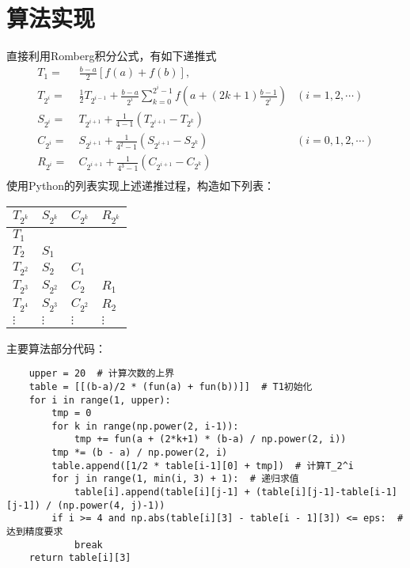 \documentclass[12pt, a4paper, oneside]{ctexart}
\begin{document}
\section{算法实现}
直接利用Romberg积分公式，有如下递推式\begin{equation*}
    \begin{aligned}
        T_1 =&\ \frac{b-a}{2}[f(a)+f(b)],\\
        T_{2^{i}} =&\ \frac{1}{2}T_{2^{i-1}}+\frac{b-a}{2^i}\sum_{k=0}^{2^i-1}f(a+(2k+1)\frac{b-1}{2^i})&(i=1,2,\cdots)\\
        S_{2^{i}} =&\ T_{2^{i+1}}+\frac{1}{4-1}(T_{2^{i+1}}-T_{2^k})\\
        C_{2^{i}} =&\ S_{2^{i+1}}+\frac{1}{4^2-1}(S_{2^{i+1}}-S_{2^k})&(i=0,1,2,\cdots)\\
        R_{2^{i}} =&\ C_{2^{i+1}}+\frac{1}{4^3-1}(C_{2^{i+1}}-C_{2^k})\\
    \end{aligned}
\end{equation*}
使用Python的列表实现上述递推过程，构造如下列表：
\renewcommand\arraystretch{0.8} %
\begin{table}[!htbp] %
    \centering %
    \begin{tabular}{p{3cm}<{\centering}p{3cm}<{\centering}p{3cm}<{\centering}p{3cm}<{\centering}} %
        \toprule
        $T_{2^k}$ & $S_{2^k}$ & $C_{2^k}$ & $R_{2^k}$\\
        \midrule
        $T_1$ &  &                  &                          \\
        $T_2$ & $S_1$ &         &                          \\
        $T_{2^2}$ & $S_2$ & $C_1$ & \\
        $T_{2^3}$ & $S_{2^2}$ & $C_2$ & $R_1$\\
        $T_{2^4}$ & $S_{2^3}$ & $C_{2^2}$ & $R_2$\\
        $\vdots$ & $\vdots$ & $\vdots$ & $\vdots$\\
        \bottomrule
    \end{tabular}
\end{table}
\newpage
主要算法部分代码：
\begin{lstlisting}
    upper = 20  # 计算次数的上界
    table = [[(b-a)/2 * (fun(a) + fun(b))]]  # T1初始化
    for i in range(1, upper):
        tmp = 0
        for k in range(np.power(2, i-1)):
            tmp += fun(a + (2*k+1) * (b-a) / np.power(2, i))
        tmp *= (b - a) / np.power(2, i)
        table.append([1/2 * table[i-1][0] + tmp])  # 计算T_2^i
        for j in range(1, min(i, 3) + 1):  # 递归求值
            table[i].append(table[i][j-1] + (table[i][j-1]-table[i-1][j-1]) / (np.power(4, j)-1))
        if i >= 4 and np.abs(table[i][3] - table[i - 1][3]) <= eps:  # 达到精度要求
            break
    return table[i][3]
\end{lstlisting}
\end{document}
